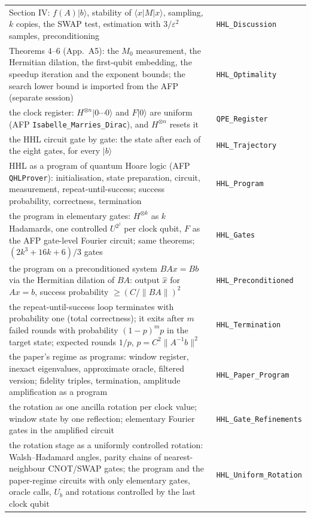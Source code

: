 \documentclass[11pt,a4paper]{article}
\newcommand{\ket}[1]{|#1\rangle}
\newcommand{\norm}[1]{\|#1\|}
\theoremstyle{definition}
\begin{document}
{\begin{longtable}{p{}l}
Section IV: $f(A)\ket b$, stability of $\langle x|M|x\rangle$, sampling, $k$ copies, the SWAP test, estimation with $3/\varepsilon^2$ samples, preconditioning & \texttt{HHL\_Discussion}\\
Theorems 4--6 (App.~A5): the $M_0$ measurement, the Hermitian dilation, the first-qubit embedding, the speedup iteration and the exponent bounds; the search lower bound is imported from the AFP (separate session) & \texttt{HHL\_Optimality}\\
the clock register: $H^{\otimes n}\ket{0\cdots0}$ and $F\ket0$ are uniform (AFP \texttt{Isabelle\_Marries\_Dirac}), and $H^{\otimes n}$ resets it & \texttt{QPE\_Register}\\
the HHL circuit gate by gate: the state after each of the eight gates, for every $\ket b$ & \texttt{HHL\_Trajectory}\\
HHL as a program of quantum Hoare logic (AFP \texttt{QHLProver}): initialisation, state preparation, circuit, measurement, repeat-until-success; success probability, correctness, termination & \texttt{HHL\_Program}\\
the program in elementary gates: $H^{\otimes k}$ as $k$ Hadamards, one controlled $U^{2^j}$ per clock qubit, $F$ as the AFP gate-level Fourier circuit; same theorems; $(2k^3+16k+6)/3$ gates & \texttt{HHL\_Gates}\\
the program on a preconditioned system $BAx=Bb$ via the Hermitian dilation of $BA$: output $\hat x$ for $Ax=b$, success probability $\ge(C/\norm{BA})^2$ & \texttt{HHL\_Preconditioned}\\
the repeat-until-success loop terminates with probability one (total correctness); it exits after $m$ failed rounds with probability $(1-p)^mp$ in the target state; expected rounds $1/p$, $p=C^2\norm{A^{-1}b}^2$ & \texttt{HHL\_Termination}\\
the paper's regime as programs: window register, inexact eigenvalues, approximate oracle, filtered version; fidelity triples, termination, amplitude amplification as a program & \texttt{HHL\_Paper\_Program}\\
the rotation as one ancilla rotation per clock value; window state by one reflection; elementary Fourier gates in the amplified circuit & \texttt{HHL\_Gate\_Refinements}\\
the rotation stage as a uniformly controlled rotation: Walsh--Hadamard angles, parity chains of nearest-neighbour CNOT/SWAP gates; the program and the paper-regime circuits with only elementary gates, oracle calls, $U_b$ and rotations controlled by the last clock qubit & \texttt{HHL\_Uniform\_Rotation}\\

\end{longtable}}
\end{document}
